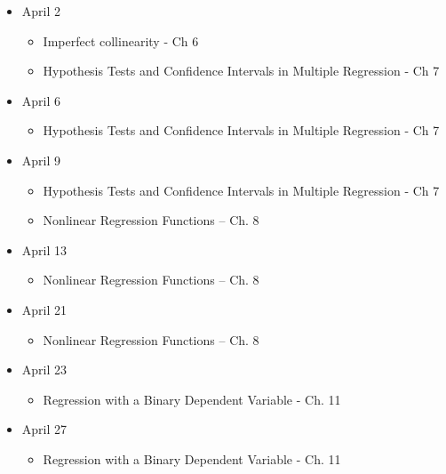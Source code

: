 \documentclass[
]{book}
\providecommand{\tightlist}{%
  \setlength{\itemsep}{0pt}\setlength{\parskip}{0pt}}
\begin{document}
\begin{itemize}
\tightlist
\item
  April 2

  \begin{itemize}
  \tightlist
  \item
    Imperfect collinearity - Ch 6\\
  \item
    Hypothesis Tests and Confidence Intervals in Multiple Regression - Ch 7
  \end{itemize}
\item
  April 6

  \begin{itemize}
  \tightlist
  \item
    Hypothesis Tests and Confidence Intervals in Multiple Regression - Ch 7
  \end{itemize}
\item
  April 9

  \begin{itemize}
  \tightlist
  \item
    Hypothesis Tests and Confidence Intervals in Multiple Regression - Ch 7
  \item
    Nonlinear Regression Functions -- Ch. 8
  \end{itemize}
\item
  April 13

  \begin{itemize}
  \tightlist
  \item
    Nonlinear Regression Functions -- Ch. 8
  \end{itemize}
\item
  April 21

  \begin{itemize}
  \tightlist
  \item
    Nonlinear Regression Functions -- Ch. 8
  \end{itemize}
\item
  April 23

  \begin{itemize}
  \tightlist
  \item
    Regression with a Binary Dependent Variable - Ch. 11
  \end{itemize}
\item
  April 27

  \begin{itemize}
  \tightlist
  \item
    Regression with a Binary Dependent Variable - Ch. 11
  \end{itemize}
\end{itemize}

  
\end{document}
